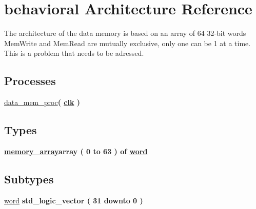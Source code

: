 \hypertarget{classdata__memory_1_1behavioral}{\section{behavioral \-Architecture \-Reference}
\label{classdata__memory_1_1behavioral}
}


\-The architecture of the data memory is based on an array of 64 32-\/bit words  \-Mem\-Write and \-Mem\-Read are mutually exclusive, only one can be 1 at a time. \-This is a problem that needs to be adressed.  


\*
\*
\subsection*{\-Processes}
 \begin{DoxyCompactItemize}
\item 
\hyperlink{classdata__memory_1_1behavioral_ac2cd56108b347ccbbc8e30b2581e8080}{data\-\_\-mem\-\_\-proc}{\bfseries  ( {\bfseries {\bfseries \hyperlink{classdata__memory_a78bd51cc257fe0e8fa69227fc1865a8e}{clk}}   } )}
\end{DoxyCompactItemize}
\subsection*{\-Types}
 \begin{DoxyCompactItemize}
\item 
{\bfseries \hyperlink{classdata__memory_1_1behavioral_ac31cac8abdfb8b066dcf91fe2b778136}{memory\-\_\-array}{\bfseries array (  0    to    63  )  of {\bfseries \hyperlink{classdata__memory_1_1behavioral_a308660f491ef67a20defcc591dfcef4b}{word}}  }} 
\end{DoxyCompactItemize}
\subsection*{\-Subtypes}
 \begin{DoxyCompactItemize}
\item 
\hyperlink{classdata__memory_1_1behavioral_a308660f491ef67a20defcc591dfcef4b}{word} {\bfseries std\-\_\-logic\-\_\-vector (   31    downto    0  ) } 
\end{DoxyCompactItemize}
